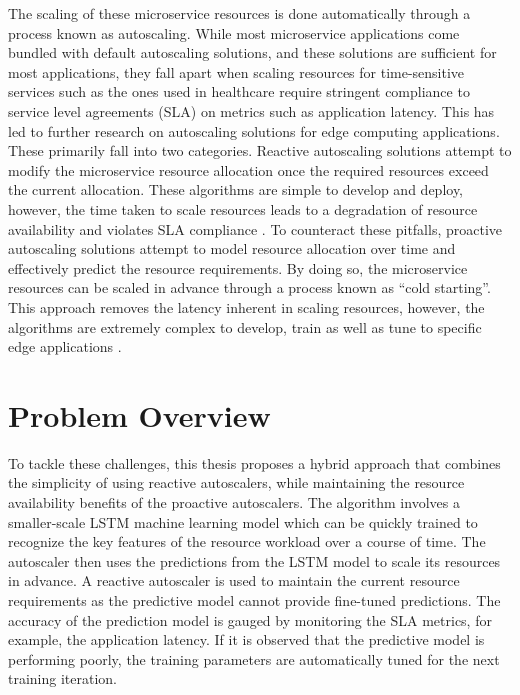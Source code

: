 The scaling of these microservice resources is done automatically through a process known as autoscaling. While most microservice applications come bundled with default autoscaling solutions, and these solutions are sufficient for most applications, they fall apart when scaling resources for time-sensitive services such as the ones used in healthcare require stringent compliance to service level agreements (SLA) on metrics such as application latency. This has led to further research on autoscaling solutions for edge computing applications. These primarily fall into two categories. Reactive autoscaling solutions attempt to modify the microservice resource allocation once the required resources exceed the current allocation. These algorithms are simple to develop and deploy, however, the time taken to scale resources leads to a degradation of resource availability and violates SLA compliance \cite{podolskiy2018iaas}. To counteract these pitfalls, proactive autoscaling solutions attempt to model resource allocation over time and effectively predict the resource requirements. By doing so, the microservice resources can be scaled in advance through a process known as ``cold starting''. This approach removes the latency inherent in scaling resources, however, the algorithms are extremely complex to develop, train as well as tune to specific edge applications \cite{straesser2022not}.

\section{Problem Overview}
\label{sec:problem-overview}

To tackle these challenges, this thesis proposes a hybrid approach that combines the simplicity of using reactive autoscalers, while maintaining the resource availability benefits of the proactive autoscalers. The algorithm involves a smaller-scale LSTM machine learning model which can be quickly trained to recognize the key features of the resource workload over a course of time. The autoscaler then uses the predictions from the LSTM model to scale its resources in advance. A reactive autoscaler is used to maintain the current resource requirements as the predictive model cannot provide fine-tuned predictions. The accuracy of the prediction model is gauged by monitoring the SLA metrics, for example, the application latency. If it is observed that the predictive model is performing poorly, the training parameters are automatically tuned for the next training iteration.\par

